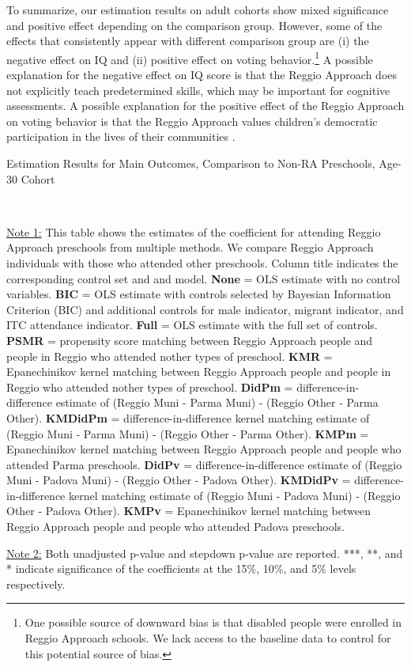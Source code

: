 To summarize, our estimation results on adult cohorts show mixed significance and positive effect depending on the comparison group. However, some of the effects that consistently appear with different comparison group are (i) the negative effect on IQ and (ii) positive effect on voting behavior.\footnote{One possible source of downward bias is that disabled people were enrolled in Reggio Approach schools. We lack access to the baseline data to control for this potential source of bias.} A possible explanation for the negative effect on IQ score is that the Reggio Approach does not explicitly teach predetermined skills, which may be important for cognitive assessments\citep{Cagliari-etal-eds_2016_BOOK_Loris-Malaguzzi}. A possible explanation for the positive effect of the Reggio Approach on voting behavior is that the Reggio Approach values children's democratic participation in the lives of their communities \citep{Lazzari_2012_Euro-J-Edu}.


\begin{table}[H] \caption{Estimation Results for Main Outcomes, Comparison to Non-RA Preschools, Age-30 Cohort} \label{ols-M-adult30-reg-pres}
\scalebox{0.6}{}
\vspace{1ex} \\
\footnotesize\raggedright{\underline{Note 1:} This table shows the estimates of the coefficient for attending Reggio Approach preschools from multiple methods. We compare Reggio Approach individuals with those who attended other preschools. Column title indicates the corresponding control set and and model. \textbf{None} = OLS estimate with no control variables. \textbf{BIC} = OLS estimate with controls selected by Bayesian Information Criterion (BIC) and additional controls for male indicator, migrant indicator, and ITC attendance indicator. \textbf{Full} = OLS estimate with the full set of controls. \textbf{PSMR} =  propensity score matching between Reggio Approach people and people in Reggio who attended nother types of preschool. \textbf{KMR} = Epanechinikov kernel matching between Reggio Approach people and people in Reggio who attended nother types of preschool. \textbf{DidPm} = difference-in-difference estimate of (Reggio Muni - Parma Muni) - (Reggio Other - Parma Other). \textbf{KMDidPm} = difference-in-difference kernel matching estimate of (Reggio Muni - Parma Muni) - (Reggio Other - Parma Other).  \textbf{KMPm} = Epanechinikov kernel matching between Reggio Approach people and people who attended Parma preschools. \textbf{DidPv} = difference-in-difference estimate of (Reggio Muni - Padova Muni) - (Reggio Other - Padova Other). \textbf{KMDidPv} = difference-in-difference kernel matching estimate of (Reggio Muni - Padova Muni) - (Reggio Other - Padova Other).  \textbf{KMPv} = Epanechinikov kernel matching between Reggio Approach people and people who attended Padova preschools.}

\footnotesize\raggedright{\underline{Note 2:} Both unadjusted p-value and stepdown p-value are reported. ***, **, and * indicate significance of the coefficients at the 15\%, 10\%, and 5\% levels respectively.}
\end{table}

